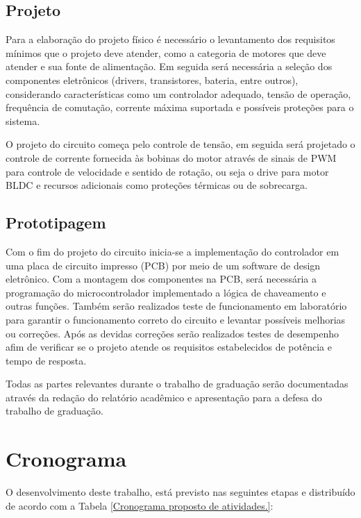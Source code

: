 \documentclass[12pt, a4paper]{article}
\begin{document}
\pagebreak

\subsection{Projeto}
Para a elaboração do projeto físico é necessário o levantamento dos requisitos mínimos que o projeto deve atender, como a categoria de motores que deve atender e sua fonte de alimentação. Em seguida será necessária a seleção dos componentes eletrônicos (drivers, transistores, bateria, entre outros), considerando características como um controlador adequado, tensão de operação, frequência de comutação, corrente máxima suportada e possíveis proteções para o sistema.

O projeto do circuito começa pelo controle de tensão, em seguida será projetado o controle de corrente fornecida às bobinas do motor através de sinais de PWM para controle de velocidade e sentido de rotação, ou seja o drive para motor BLDC e recursos adicionais como proteções térmicas ou de sobrecarga.

\subsection{Prototipagem}
Com o fim do projeto do circuito inicia-se a implementação do controlador em uma placa de circuito impresso (PCB) por meio de um software de design eletrônico. Com a montagem dos componentes na PCB, será necessária a programação do microcontrolador implementado a lógica de chaveamento e outras funções. Também serão realizados teste de funcionamento em laboratório para garantir o funcionamento correto do circuito e levantar possíveis melhorias ou correções. Após as devidas correções serão realizados testes de desempenho afim de verificar se o projeto atende os requisitos estabelecidos de potência e tempo de resposta.

Todas as partes relevantes durante o trabalho de graduação serão documentadas através da redação do relatório acadêmico e apresentação para a defesa do trabalho de graduação.

\section{Cronograma}

O desenvolvimento deste trabalho, está previsto nas seguintes etapas e distribuído de acordo com a Tabela \ref{Cronograma proposto de atividades.}:
\end{document}
